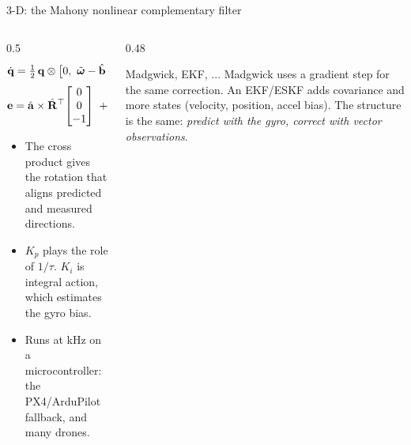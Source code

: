 \begin{frame}{3-D: the Mahony nonlinear complementary filter}
  \begin{columns}[T]
    \begin{column}{0.5\textwidth}
      \small
      \[
        \dot{\mathbf{q}} = \tfrac12\,\mathbf{q}\otimes\big[0,\ \tilde{\boldsymbol\omega}-\hat{\mathbf{b}}+K_p\,\mathbf{e}\big],\qquad
        \dot{\hat{\mathbf{b}}} = -K_i\,\mathbf{e}
      \]
      \[
        \mathbf{e} = \hat{\mathbf{a}}\times\hat{\mathbf{R}}^\top\!\begin{bmatrix}0\\0\\-1\end{bmatrix}
        \;+\; \hat{\mathbf{m}}\times\hat{\mathbf{R}}^\top\mathbf{b}_{\mathrm{ref}}
      \]
      \begin{itemize}
        \item The cross product gives the rotation that aligns predicted and measured directions.
        \item $K_p$ plays the role of $1/\tau$. $K_i$ is integral action, which estimates the gyro bias.
        \item Runs at kHz on a microcontroller: the PX4/ArduPilot fallback, and many drones.
      \end{itemize}
    \end{column}
    \begin{column}{0.48\textwidth}
      \begin{block}{Madgwick, EKF, ...}
        \small Madgwick uses a gradient step for the same correction. An EKF/ESKF adds covariance and more states (velocity, position, accel bias). The structure is the same: \emph{predict with the gyro, correct with vector observations}.
      \end{block}
    \end{column}
  \end{columns}
\end{frame}

